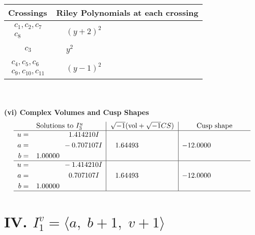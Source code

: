 \documentclass[1p]{elsarticle_modified}
\theoremstyle{definition}
\newcommand{\I}{\sqrt{-1}}
\begin{document}
\begin{tabular}{m{50pt}|m{274pt}}
Crossings & \hspace{64pt}Riley Polynomials at each crossing \\
\hline $$\begin{aligned}c_{1},c_{2},c_{7}\\c_{8}\end{aligned}$$&$\begin{aligned}
&(y+2)^2
\end{aligned}$\\
\hline $$\begin{aligned}c_{3}\end{aligned}$$&$\begin{aligned}
&y^2
\end{aligned}$\\
\hline $$\begin{aligned}c_{4},c_{5},c_{6}\\c_{9},c_{10},c_{11}\end{aligned}$$&$\begin{aligned}
&(y-1)^2
\end{aligned}$\\
\hline
\end{tabular}\\~\\
\newpage\flushleft \textbf{(vi) Complex Volumes and Cusp Shapes}
$$\begin{array}{c|c|c}  
\text{Solutions to }I^u_{3}& \I (\text{vol} + \sqrt{-1}CS) & \text{Cusp shape}\\
 \hline 
\begin{aligned}
u &= \phantom{-0.000000 -}1.414210 I \\
a &= \phantom{-0.000000 } -0.707107 I \\
b &= \phantom{-}1.00000\phantom{ +0.000000I}\end{aligned}
 & \phantom{-}1.64493\phantom{ +0.000000I} & -12.0000\phantom{ +0.000000I} \\ \hline\begin{aligned}
u &= \phantom{-0.000000 } -1.414210 I \\
a &= \phantom{-0.000000 -}0.707107 I \\
b &= \phantom{-}1.00000\phantom{ +0.000000I}\end{aligned}
 & \phantom{-}1.64493\phantom{ +0.000000I} & -12.0000\phantom{ +0.000000I}\\
 \hline 
 \end{array}$$\newpage\newpage\renewcommand{\arraystretch}{1}
\centering \section*{IV. $I^v_{1}= \langle a,\;b+1,\;v+1 \rangle$}
\end{document}
